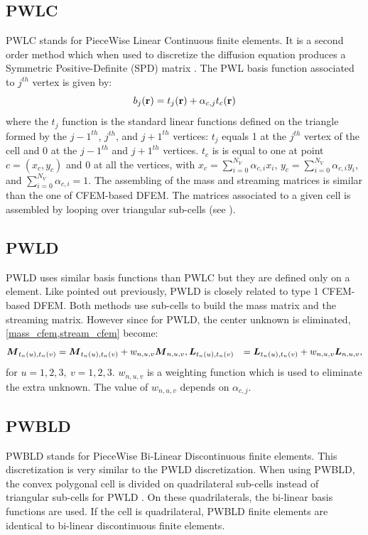 \subsection{PWLC}
PWLC stands for PieceWise Linear Continuous finite elements. It is a second
order method which when used to discretize the diffusion equation produces 
a Symmetric Positive-Definite (SPD) matrix \cite{Bailey2008}. The PWL basis 
function associated to $j^{th}$ vertex is given by:
\begin{equation}
  b_j(\mathbf{r}) = t_j(\mathbf{r}) + \alpha_{c,j} t_c(\mathbf{r})
\end{equation}
where the $t_j$ function is the standard linear functions defined on the
triangle formed by the $j-1^{th}$, $j^{th}$, and $j+1^{th}$ vertices:
$t_j$ equals 1 at the $j^{th}$ vertex of the cell and
0 at the $j-1^{th}$ and $j+1^{th}$ vertices. $t_c$ is
is equal to one at point $c=(x_c,y_c)$ and 0 at all the vertices, with $x_c =
\sum_{i=0}^{N_V} \alpha_{c,i} x_i$, $y_c = \sum_{i=0}^{N_V} \alpha_{c,i} y_i$,
and $\sum_{i=0}^{N_V} \alpha_{c,i} = 1$. The assembling of the mass and 
streaming matrices is similar than the one of CFEM-based DFEM. The matrices
associated to a given cell is assembled by looping over triangular sub-cells
(see ).
\subsection{PWLD} \label{subsec_pwld}
PWLD uses similar basis functions than PWLC but they are defined only on a
element. Like pointed out previously, PWLD is closely related to type 1
CFEM-based DFEM. Both methods use sub-cells to build the mass matrix and the
streaming matrix. However since for PWLD, the center unknown is eliminated,
\cref{mass_cfem,stream_cfem} become:
\begin{align}
  \boldsymbol{M}_{t_n(u),t_n(v)} &= \boldsymbol{M}_{t_n(u),t_n(v)} + w_{n,u,v}\boldsymbol{M}_{n,u,v}, 
  \boldsymbol{L}_{t_n(u),t_n(v)} &= \boldsymbol{L}_{t_n(u),t_n(v)} + w_{n,u,v} \boldsymbol{L}_{n,u,v}, 
\end{align}
for $u=1,2,3,\ v=1,2,3$. $w_{n,u,v}$ is a weighting function which is used to
eliminate the extra unknown. The value of $w_{n,u,v}$ depends on
$\alpha_{c,j}$.

\subsection{PWBLD}
PWBLD stands for PieceWise Bi-Linear Discontinuous finite elements. This 
discretization is very similar to the PWLD discretization. When using PWBLD, 
the convex polygonal cell is divided on quadrilateral sub-cells instead of
triangular sub-cells for PWLD \cite{Bailey2011}. On these quadrilaterals, 
the bi-linear basis functions are used. If the cell is 
quadrilateral, PWBLD finite elements are identical to bi-linear discontinuous 
finite elements.

